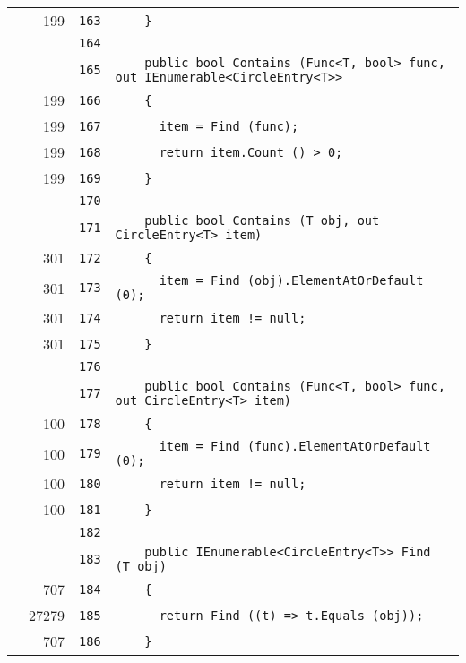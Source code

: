 \documentclass[a4paper,10pt]{article}
\begin{document}
\begin{longtable}[l]{lrrl}
\cellcolor{green} & 199 & \verb~163~ & \verb~    }~\\
\cellcolor{gray} &  & \verb~164~ & \verb~~\\
\cellcolor{gray} &  & \verb~165~ & \verb~    public bool Contains (Func<T, bool> func, out IEnumerable<CircleEntry<T>> ~\\
\cellcolor{green} & 199 & \verb~166~ & \verb~    {~\\
\cellcolor{green} & 199 & \verb~167~ & \verb~      item = Find (func);~\\
\cellcolor{green} & 199 & \verb~168~ & \verb~      return item.Count () > 0;~\\
\cellcolor{green} & 199 & \verb~169~ & \verb~    }~\\
\cellcolor{gray} &  & \verb~170~ & \verb~~\\
\cellcolor{gray} &  & \verb~171~ & \verb~    public bool Contains (T obj, out CircleEntry<T> item)~\\
\cellcolor{green} & 301 & \verb~172~ & \verb~    {~\\
\cellcolor{green} & 301 & \verb~173~ & \verb~      item = Find (obj).ElementAtOrDefault (0);~\\
\cellcolor{green} & 301 & \verb~174~ & \verb~      return item != null;~\\
\cellcolor{green} & 301 & \verb~175~ & \verb~    }~\\
\cellcolor{gray} &  & \verb~176~ & \verb~~\\
\cellcolor{gray} &  & \verb~177~ & \verb~    public bool Contains (Func<T, bool> func, out CircleEntry<T> item)~\\
\cellcolor{green} & 100 & \verb~178~ & \verb~    {~\\
\cellcolor{green} & 100 & \verb~179~ & \verb~      item = Find (func).ElementAtOrDefault (0);~\\
\cellcolor{green} & 100 & \verb~180~ & \verb~      return item != null;~\\
\cellcolor{green} & 100 & \verb~181~ & \verb~    }~\\
\cellcolor{gray} &  & \verb~182~ & \verb~~\\
\cellcolor{gray} &  & \verb~183~ & \verb~    public IEnumerable<CircleEntry<T>> Find (T obj)~\\
\cellcolor{green} & 707 & \verb~184~ & \verb~    {~\\
\cellcolor{green} & 27279 & \verb~185~ & \verb~      return Find ((t) => t.Equals (obj));~\\
\cellcolor{green} & 707 & \verb~186~ & \verb~    }~\\

\end{longtable}
\end{document}
